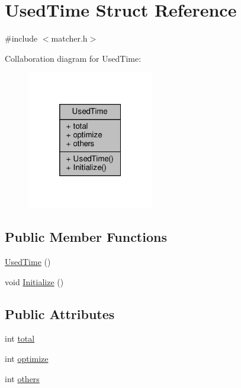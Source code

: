 \hypertarget{structUsedTime}{}\section{Used\+Time Struct Reference}
\label{structUsedTime}


{\ttfamily \#include $<$matcher.\+h$>$}



Collaboration diagram for Used\+Time\+:\nopagebreak
\begin{figure}[H]
\begin{center}
\leavevmode
\includegraphics[width=157pt]{dc/d28/structUsedTime__coll__graph}
\end{center}
\end{figure}
\subsection*{Public Member Functions}
\begin{DoxyCompactItemize}
\item 
\hyperlink{structUsedTime_a8cf394c31ea00d9005586318e7b5102f}{Used\+Time} ()
\item 
void \hyperlink{structUsedTime_aacf9a820cf38fee8a04bc6b353305f72}{Initialize} ()
\end{DoxyCompactItemize}
\subsection*{Public Attributes}
\begin{DoxyCompactItemize}
\item 
int \hyperlink{structUsedTime_a8ee888b4df3b9aa70450480eae92cd82}{total}
\item 
int \hyperlink{structUsedTime_a6a7fe5130ec78b4e47238a50da127954}{optimize}
\item 
int \hyperlink{structUsedTime_a7a75c587cf7d911a6507259c6961c2bd}{others}
\end{DoxyCompactItemize}


